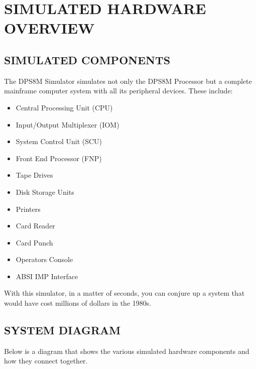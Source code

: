 \section[Simulated Hardware Overview]{SIMULATED HARDWARE OVERVIEW}

\subsection[Simulated Components]{SIMULATED COMPONENTS}

The DPS8M Simulator simulates not only the DPS8M Processor but a complete mainframe
computer system with all its peripheral devices. These include:
\begin{itemize}
	\item Central Processing Unit (CPU)
	\item Input/Output Multiplexer (IOM)
	\item System Control Unit (SCU)
	\item Front End Processor (FNP)
	\item Tape Drives
	\item Disk Storage Units
	\item Printers
	\item Card Reader
	\item Card Punch
	\item Operators Console
	\item ABSI IMP Interface
\end{itemize} 

With this simulator, in a matter of seconds, you can conjure up a system that would
have cost millions of dollars in the 1980s.

\subsection[System Diagram]{SYSTEM DIAGRAM }

Below is a diagram that shows the various simulated hardware components and how they connect together.

